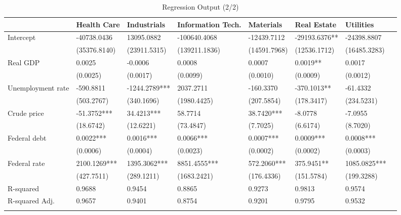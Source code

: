 \documentclass[a4paper,12pt]{article}
\begin{document}
\begin{table}
\caption{Regression Output (2/2)}
\label{}
\begin{center}
\tiny
\begin{tabular}{llllllll}  \hline                    &  Health Care & Industrials & Information Tech. & Materials & Real Estate & Utilities  \\  \hline 
Intercept             & -40738.0436      & 13095.0882        & -100640.4068          & -12439.7112     & -29193.6376**    & -24398.8807      \\                      & (35376.8140)     & (23911.5315)      & (139211.1836)         & (14591.7968)    & (12536.1712)     & (16485.3283)     \\  
Real GDP            & 0.0025           & -0.0006           & 0.0008                & 0.0007          & 0.0019**         & 0.0017           \\                     & (0.0025)         & (0.0017)          & (0.0099)              & (0.0010)        & (0.0009)         & (0.0012)         \\  
Unemployment rate     & -590.8811        & -1244.2789***     & 2037.2711             & -160.3370       & -370.1013**      & -61.4332         \\                        & (503.2767)       & (340.1696)        & (1980.4425)           & (207.5854)      & (178.3417)       & (234.5231)       \\  
Crude price              & -51.3752***      & 34.4213***        & 58.7714               & 38.7420***      & -8.0778          & -7.0955          \\                       & (18.6742)        & (12.6221)         & (73.4847)             & (7.7025)        & (6.6174)         & (8.7020)         \\  
Federal debt            & 0.0022***        & 0.0016***         & 0.0066***             & 0.0007***       & 0.0009***        & 0.0008***        \\                        & (0.0006)         & (0.0004)          & (0.0023)              & (0.0002)        & (0.0002)         & (0.0003)         \\  
Federal rate        & 2100.1269***     & 1395.3062***      & 8851.4555***          & 572.2060***     & 375.9451**       & 1085.0825***     \\                  & (427.7511)       & (289.1211)        & (1683.2421)           & (176.4336)      & (151.5784)       & (199.3288)       \\ \hline  
R-squared           & 0.9688           & 0.9454            & 0.8865                & 0.9273          & 0.9813           & 0.9574           \\   
R-squared Adj.              & 0.9657           & 0.9401            & 0.8754                & 0.9201          & 0.9795           & 0.9532           \\  \hline  \\
\end{tabular}
\end{center}
\end{table}
\end{document}
